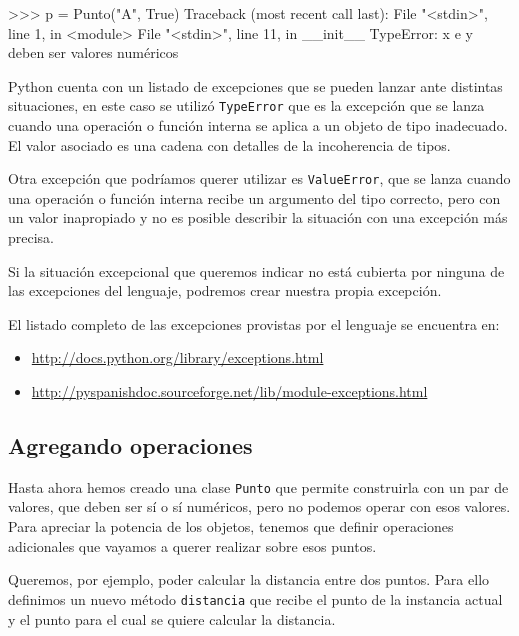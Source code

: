 \begin{codigo-python-sn}
>>> p = Punto("A", True)
Traceback (most recent call last):
  File "<stdin>", line 1, in <module>
  File "<stdin>", line 11, in __init__
TypeError: x e y deben ser valores numéricos
\end{codigo-python-sn}

\begin{sabias_que}
Python cuenta con un listado de excepciones que se pueden lanzar ante
distintas situaciones, en este caso se utilizó \lstinline!TypeError! que es
la excepción que se lanza cuando una operación o función interna se aplica
a un objeto de tipo inadecuado. El valor asociado es una cadena con
detalles de la incoherencia de tipos.

Otra excepción que podríamos querer utilizar es \lstinline!ValueError!, que
se lanza cuando una operación o función interna recibe un argumento del
tipo correcto, pero con un valor inapropiado y no es posible describir la
situación con una excepción más precisa.

Si la situación excepcional que queremos indicar no está cubierta por
ninguna de las excepciones del lenguaje, podremos crear nuestra propia
excepción.

El listado completo de las excepciones provistas por el lenguaje se
encuentra en:
\begin{itemize}
\item \url{http://docs.python.org/library/exceptions.html}
\item \url{http://pyspanishdoc.sourceforge.net/lib/module-exceptions.html}
\end{itemize}
\end{sabias_que}

\subsection{Agregando operaciones}

Hasta ahora hemos creado una clase \lstinline!Punto! que permite
construirla con un par de valores, que deben ser sí o sí numéricos, pero no
podemos operar con esos valores.  Para apreciar la potencia de los objetos,
tenemos que definir operaciones adicionales que vayamos a querer realizar
sobre esos puntos.

Queremos, por ejemplo, poder calcular la distancia entre dos puntos.  Para
ello definimos un nuevo método \lstinline!distancia! que recibe el punto de
la instancia actual y el punto para el cual se quiere calcular la
distancia.

